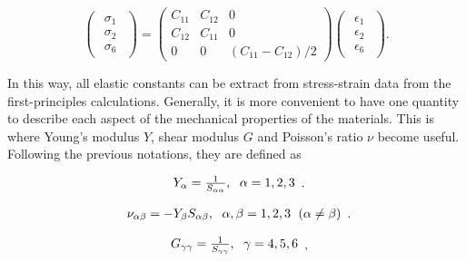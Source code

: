\begin{equation}
\begin{pmatrix} \begin{array}{c} \sigma_1 \\ \sigma_2 \\ \sigma_6 \end{array} 
\end{pmatrix}
=
 \begin{pmatrix}
  C_{11} & C_{12} & 0  \\
  C_{12} & C_{11} & 0  \\
  0 & 0 & (C_{11}-C_{12})/2
 \end{pmatrix}
 \begin{pmatrix} \begin{array}{c} \epsilon_1 \\ \epsilon_2 \\ \epsilon_6 
\end{array} \end{pmatrix}.
\end{equation} 

In this way, all elastic constants can be extract from stress-strain data from the first-principles calculations. Generally, it is more convenient to have one quantity to describe each aspect of the mechanical properties of the materials. This is where Young's modulus $Y$, shear modulus $G$ and Poisson's ratio $\nu$ become useful. Following the previous notations, they are defined as 

\begin{equation}
\begin{array}{c}

Y_\alpha=\frac{1}{S_{\alpha\alpha}},\hspace{6 pt} \alpha = 1, 2, 3
\end{array}.
\end{equation}

\begin{equation}
\begin{array}{c}
\nu_{\alpha\beta}=-Y_\beta S_{\alpha\beta},\hspace{6 pt} \alpha, \beta = 1, 2, 3 
\hspace{6 pt}(\alpha\neq\beta)
\end{array}.
\end{equation}

\begin{equation}
\begin{array}{c}
G_{\gamma\gamma}=\frac{1}{S_{\gamma\gamma}} ,\hspace{6 pt} \gamma = 4, 5, 6
\end{array},
\end{equation}

